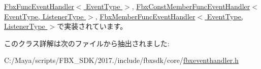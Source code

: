 \hyperlink{class_fbx_func_event_handler_af196b87b07e698704615056be5923745}{Fbx\+Func\+Event\+Handler$<$ Event\+Type $>$}, \hyperlink{class_fbx_const_member_func_event_handler_a9e370edd4a746ef5098d39a4f9c3d63c}{Fbx\+Const\+Member\+Func\+Event\+Handler$<$ Event\+Type, Listener\+Type $>$}, \hyperlink{class_fbx_member_func_event_handler_ad45db7b531f23f9e7776c93bec100668}{Fbx\+Member\+Func\+Event\+Handler$<$ Event\+Type, Listener\+Type $>$}で実装されています。



このクラス詳解は次のファイルから抽出されました\+:\begin{DoxyCompactItemize}
\item 
C\+:/\+Maya/scripts/\+F\+B\+X\+\_\+\+S\+D\+K/2017./include/fbxsdk/core/\hyperlink{fbxeventhandler_8h}{fbxeventhandler.\+h}\end{DoxyCompactItemize}
